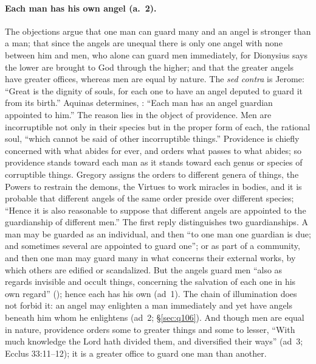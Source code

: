 \paragraph{Each man has his own angel (a.~2).} The objections argue that one
man can guard many and an angel is stronger than a man; that since the
angels are unequal there is only one angel with none between him and men,
who alone can guard men immediately, for Dionysius says the lower are
brought to God through the higher; and that the greater angels have greater
offices, whereas men are equal by nature. The \emph{sed contra} is Jerome:
``Great is the dignity of souls, for each one to have an angel deputed to
guard it from its birth.'' Aquinas determines, : ``Each man has an angel guardian
appointed to him.'' The reason lies in the object of providence. Men are
incorruptible not only in their species but in the proper form of each, the
rational soul, ``which cannot be said of other incorruptible things.''
Providence is chiefly concerned with what abides for ever, and orders what
passes to what abides; so providence stands toward each man as it stands
toward each genus or species of corruptible things. Gregory assigns the
orders to different genera of things, the Powers to restrain the demons, the
Virtues to work miracles in bodies, and it is probable that different
angels of the same order preside over different species; ``Hence it is also
reasonable to suppose that different angels are appointed to the
guardianship of different men.'' The first reply distinguishes two
guardianships. A man may be guarded as an individual, and then ``to one man
one guardian is due; and sometimes several are appointed to guard one''; or
as part of a community, and then one man may guard many in what concerns
their external works, by which others are edified or scandalized. But the
angels guard men ``also as regards invisible and occult things, concerning
the salvation of each one in his own regard'' (); hence
each has his own (ad~1). The chain of illumination does not forbid it: an
angel may enlighten a man immediately and yet have angels beneath him whom
he enlightens (ad~2; \S\ref{sec:q106}). And though men are equal in nature,
providence orders some to greater things and some to lesser, ``With much
knowledge the Lord hath divided them, and diversified their ways'' (ad~3;
Ecclus 33:11--12); it is a greater office to guard one man than another.

